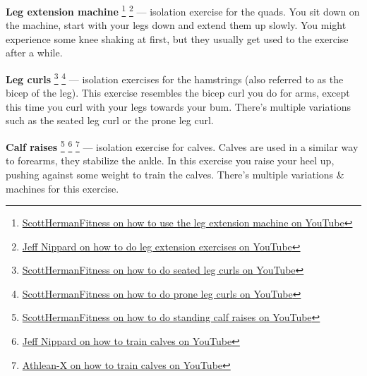 \documentclass[openany, 12pt]{book}
\begin{document}
        \textbf{Leg extension machine}
        \footnote{\href{https://www.youtube.com/watch?v=YyvSfVjQeL0}{ScottHermanFitness on how to use the leg extension machine on YouTube}}
        \footnote{\href{https://www.youtube.com/watch?v=ljO4jkwv8wQ}{Jeff Nippard on how to do leg extension exercises on YouTube}}
        ---
        isolation exercise for the quads. You sit down on the machine, start with your legs down and extend them up slowly. You might experience some knee shaking at first, but they usually get used
        to the exercise after a while.
        
        \textbf{Leg curls}
        \footnote{\href{https://www.youtube.com/watch?v=ELOCsoDSmrg}{ScottHermanFitness on how to do seated leg curls on YouTube}}
        \footnote{\href{https://www.youtube.com/watch?v=1Tq3QdYUuHs}{ScottHermanFitness on how to do prone leg curls on YouTube}}
        ---
        isolation exercises for the hamstrings (also referred to as the bicep of the leg). This exercise resembles the bicep curl you do for arms, except this time you curl with your legs
        towards your bum.
        There's multiple variations such as the seated leg curl or the prone leg curl.

        \textbf{Calf raises}
        \footnote{\href{https://www.youtube.com/watch?v=YMmgqO8Jo-k}{ScottHermanFitness on how to do standing calf raises on YouTube}}
        \footnote{\href{https://www.youtube.com/watch?v=-qsRtp_PbVM}{Jeff Nippard on how to train calves on YouTube}}
        \footnote{\href{https://www.youtube.com/watch?v=esdQSIxteQg}{Athlean-X on how to train calves on YouTube}}
        ---
        isolation exercise for calves. Calves are used in a similar way to forearms, they stabilize the ankle. In this exercise you raise your heel up, pushing against some weight to train the calves.
        There's multiple variations \& machines for this exercise.
\end{document}
